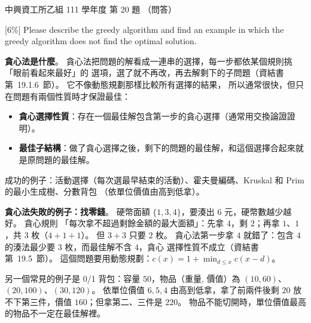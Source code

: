 \begin{pastexam}[label={px:nchu-111-is-09}]{中興資工所乙組 111 學年度 第 20 題}
（問答）

{[6\%]} Please describe the greedy algorithm and find an example in which the greedy algorithm does not find
the optimal solution.
\end{pastexam}

\begin{pastsoln}
\textbf{貪心法是什麼}。 貪心法把問題的解看成一連串的選擇，每一步都依某個規則挑「眼前看起來最好」的
選項，選了就不再改，再去解剩下的子問題（資結書第~19.1.6~節）。 它不像動態規劃那樣比較所有選擇的結果，
所以通常很快，但只在問題有兩個性質時才保證最佳：
\begin{itemize}
\item \textbf{貪心選擇性質}：存在一個最佳解包含第一步的貪心選擇（通常用交換論證證明）。
\item \textbf{最佳子結構}：做了貪心選擇之後，剩下的問題的最佳解，和這個選擇合起來就是原問題的最佳解。
\end{itemize}
成功的例子：活動選擇（每次選最早結束的活動）、霍夫曼編碼、Kruskal 和 Prim 的最小生成樹、分數背包
（依單位價值由高到低拿）。

\textbf{貪心法失敗的例子：找零錢}。 硬幣面額 $\{1, 3, 4\}$，要湊出 $6$ 元，硬幣數越少越好。 貪心規則
「每次拿不超過剩餘金額的最大面額」：先拿 $4$，剩 $2$；再拿 $1$、$1$，共 $3$ 枚（$4 + 1 + 1$）。 但
$3 + 3$ 只要 $2$ 枚。 貪心法第一步拿 $4$ 就錯了：包含 $4$ 的湊法最少要 $3$ 枚，而最佳解不含 $4$，貪心
選擇性質不成立（資結書第~19.5~節）。 這個問題要用動態規劃：$c(x) = 1 + \min_{d \le x} c(x - d)$。

另一個常見的例子是 0/1 背包：容量 $50$，物品（重量, 價值）為 $(10, 60)$、$(20, 100)$、$(30, 120)$。
依單位價值 $6, 5, 4$ 由高到低拿，拿了前兩件後剩 $20$ 放不下第三件，價值 $160$；但拿第二、三件是
$220$。 物品不能切開時，單位價值最高的物品不一定在最佳解裡。
\end{pastsoln}
